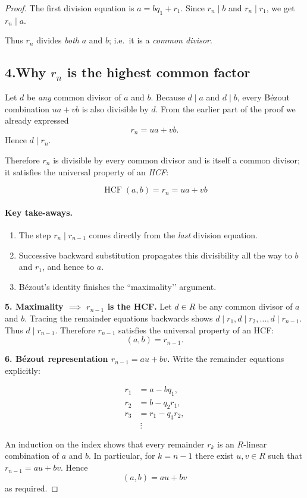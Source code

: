 \documentclass[12pt]{article}
\theoremstyle{definition} %
\theoremstyle{plain} %
\begin{document}
\begin{proof}
The first division equation is \(a=bq_{1}+r_{1}\).
Since \(r_{n}\mid b\) and \(r_{n}\mid r_{1}\), we get \(r_{n}\mid a\).

Thus \(r_{n}\) divides \emph{both} \(a\) and \(b\); i.e.\ it is a
\emph{common divisor}.

\bigskip
\subsection*{4.\;Why \(r_{n}\) is the \textbf{highest} common factor}

Let \(d\) be \emph{any} common divisor of \(a\) and \(b\).
Because \(d\mid a\) and \(d\mid b\), every Bézout combination
\(ua+vb\) is also divisible by \(d\).
From the earlier part of the proof we already expressed
\[
   r_{n}=ua+vb.
\]
Hence \(d\mid r_{n}\).

Therefore \(r_{n}\) is divisible by every common divisor and is itself a
common divisor; it satisfies the universal property of an \emph{HCF}:

\[
     \boxed{\;\operatorname{HCF}(a,b)=r_{n}=ua+vb\;}
\]

\bigskip
\paragraph{Key take-aways.}
\begin{enumerate}
  \item The step \(r_{n}\mid r_{n-1}\) comes directly from the \emph{last}
        division equation.
  \item Successive backward substitution propagates this divisibility
        all the way to \(b\) and \(r_{1}\), and hence to \(a\).
  \item Bézout’s identity finishes the “maximality’’ argument.
\end{enumerate}
  
  \smallskip
  \textbf{5.  Maximality $\implies$   \(r_{n-1}\) is the HCF.}  
  Let \(d\in R\) be any common divisor of \(a\) and \(b\).
  Tracing the remainder equations backwards shows \(d\mid r_{1},d\mid r_{2},
  \dots,d\mid r_{n-1}\).  Thus \(d\mid r_{n-1}\).
  Therefore \(r_{n-1}\) satisfies the universal property of an HCF:
  \[
     (a,b)=r_{n-1}.
  \]
  
  \smallskip
  \textbf{6.  Bézout representation \(r_{n-1}=au+bv\).}  
  Write the remainder equations explicitly:
  
  \[
  \begin{aligned}
     r_{1} &= a - bq_{1},\\
     r_{2} &= b - q_{2}r_{1},\\
     r_{3} &= r_{1} - q_{3}r_{2},\\[-2pt]
           &\ \vdots
  \end{aligned}
  \]
  
  An induction on the index shows that every remainder \(r_{k}\) is an
  \(R\)-linear combination of \(a\) and \(b\).
  In particular, for \(k=n-1\) there exist \(u,v\in R\) such that
  \(
     r_{n-1}=au+bv.
  \)
  Hence
  \[
     \boxed{\;(a,b)=au+bv\;}
  \]
  as required.
  \end{proof}
\end{document}
